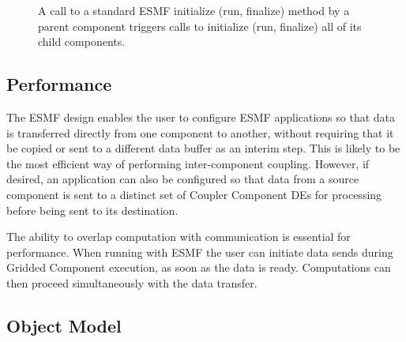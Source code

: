 \begin{center}
\begin{figure}
\caption{A call to a standard ESMF initialize (run, finalize) method
by a parent component triggers calls to initialize (run, finalize) 
all of its child components.}
\label{fig:appunit}
\end{figure}
\end{center}

\subsection{Performance}
\label{sec:performance}

The ESMF design enables the user to configure ESMF
applications so that data is transferred directly from one component 
to another, without requiring that it be copied or sent to a different data
buffer as an interim step.  This is likely to be the most efficient way 
of performing inter-component coupling.  However, if desired, an 
application can also be configured so that data from a source component 
is sent to a distinct set of Coupler Component DEs for processing 
before being sent to its destination.

The ability to overlap computation with communication is essential for
performance.  When running with ESMF the user can initiate data 
sends during Gridded Component execution, as soon as the data is ready.
Computations can then proceed simultaneously with the data transfer.

\newpage
\subsection{Object Model}

